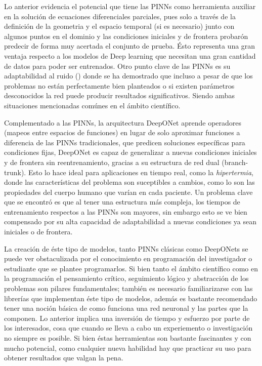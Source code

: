 \documentclass[
  spanish,
  us-letterpaper,
  DIV=11,
  numbers=noendperiod]{scrreprt}
\theoremstyle{plain}
\theoremstyle{definition}
\theoremstyle{remark}
\begin{document}
Lo anterior evidencia el potencial que tiene las PINNs como herramienta
auxiliar en la solución de ecuaciones diferenciales parciales, pues solo
a través de la definición de la geometria y el espacio temporal (si es
necesario) junto con algunos puntos en el dominio y las condiciones
iniciales y de frontera probarón predecir de forma muy acertada el
conjunto de prueba. Ésto representa una gran ventaja respecto a los
modelos de Deep learning que necesitan una gran cantidad de datos para
poder ser entrenados. Otro punto clave de las PINNs es su adaptabilidad
al ruido ()
donde se ha demostrado que incluso a pesar de que los problemas no están
perfectamente bien planteados o si existen parámetros desconocidos la
red puede producir resultados significativos. Siendo ambas situaciones
mencionadas comúnes en el ámbito científico.

Complementado a las PINNs, la arquitectura DeepONet aprende operadores
(mapeos entre espacios de funciones) en lugar de solo aproximar
funciones a diferencia de las PINNs tradicionales, que predicen
soluciones específicas para condiciones fijas, DeepONet es capaz de
generalizar a nuevas condiciones iniciales y de frontera sin
reentrenamiento, gracias a su estructura de red dual (branch-trunk).
Esto lo hace ideal para aplicaciones en tiempo real, como la
\emph{hipertermia}, donde las características del problema son
suceptibles a cambios, como lo son las propiedades del cuerpo humano que
varían en cada paciente. Un problema clave que se encontró es que al
tener una estructura más compleja, los tiempos de entrenamiento
respectos a las PINNs son mayores, sin embargo esto se ve bien
compensado por su alta capacidad de adaptabilidad a nuevas condiciones
ya sean iniciales o de frontera.

La creación de éste tipo de modelos, tanto PINNs clásicas como DeepONets
se puede ver obstaculizada por el conocimiento en programación del
investigador o estudiante que se plantee programarlos. Si bien tanto el
ámbito científico como en la programación el pensamiento crítico,
seguimiento lógico y abstracción de los problemas son pilares
fundamentales; también es necesario familiarizarse con las librerías que
implementan éste tipo de modelos, además es bastante recomendado tener
una noción básica de como funciona una red neuronal y las partes que la
componen. Lo anterior implica una inversión de tiempo y esfuerzo por
parte de los interesados, cosa que cuando se lleva a cabo un
experiemento o investigación no siempre es posible. Si bien éstas
herramientas son bastante fascinantes y con mucho potencial, como
cualquier nueva habilidad hay que practicar su uso para obtener
resultados que valgan la pena.
\end{document}
